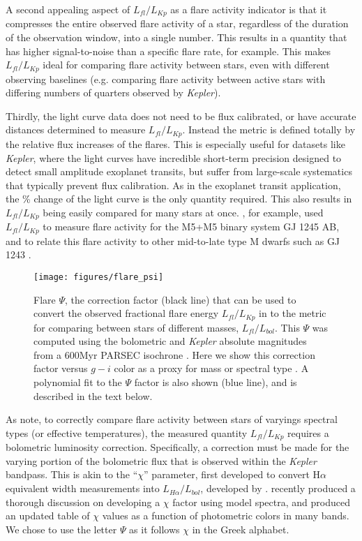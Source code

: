 \documentclass[preprint2]{aastex62}
\newcommand{\Kepler}{\textsl{Kepler}\xspace}
\begin{document}
A second appealing aspect of $L_{fl}/L_{Kp}$ as a flare activity indicator is that it compresses the entire observed flare activity of a star, regardless of the duration of the observation window, into a single number. This results in a quantity that has higher signal-to-noise than a specific flare rate, for example. This makes $L_{fl}/L_{Kp}$ ideal for comparing flare activity between stars, even with different observing baselines (e.g. comparing flare activity between active stars with differing numbers of quarters observed by \Kepler).

Thirdly, the light curve data does not need to be flux calibrated, or have accurate distances determined to measure $L_{fl}/L_{Kp}$. Instead the metric is defined totally by the relative flux increases of the flares. This is especially useful for datasets like \Kepler, where the light curves have incredible short-term precision designed to detect small amplitude exoplanet transits, but suffer from large-scale systematics that typically prevent flux calibration. As in the exoplanet transit application, the \% change of the light curve is the only quantity required. This also results in $L_{fl}/L_{Kp}$ being easily compared for many stars at once. \citet{lurie2015}, for example, used $L_{fl}/L_{Kp}$ to measure flare activity for the M5+M5 binary system GJ 1245 AB, and to relate this flare activity to other mid-to-late type M dwarfs such as GJ 1243 \citep{davenport2014b}. 



\begin{figure}[!t]
\centering
\texttt{[image: figures/flare\_psi]}
\caption{
Flare $\Psi$, the correction factor (black line) that can be used to convert the observed fractional flare energy $L_{fl}/L_{Kp}$ in to the metric for comparing between stars of different masses, $L_{fl}/L_{bol}$. This $\Psi$ was computed using the bolometric and \Kepler absolute magnitudes from a 600Myr PARSEC isochrone \citep{bressan2012}. Here we show this correction factor versus $g-i$ color as a proxy for mass or spectral type \citep[e.g. see][]{covey2007,davenport2014}. A polynomial fit to the $\Psi$ factor is also shown (blue line), and is described in the text below.
}
\label{fig:chi}
\end{figure}


As \citet{lurie2015} note, to correctly compare flare activity between stars of varyings spectral types (or effective temperatures), the measured quantity $L_{fl}/L_{Kp}$ requires a bolometric luminosity correction. Specifically, a correction must be made for the varying portion of the bolometric flux that is observed within the \Kepler bandpass. This is akin to the ``$\chi$'' parameter, first developed to convert H$\alpha$ equivalent width measurements into  $L_{H\alpha}/L_{bol}$, developed by \citet{walkowicz2004}. \citet{douglas2014} recently produced a thorough discussion on developing a $\chi$ factor using model spectra, and produced an updated table of $\chi$ values as a function of photometric colors in many bands. We chose to use the letter $\Psi$ as it follows $\chi$ in the Greek alphabet.
\end{document}
